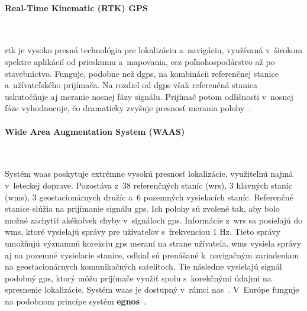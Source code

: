       \paragraph{Real-Time Kinematic (RTK) GPS} \
      
      \noindent \acrshort{rtk} je vysoko presná technológia pre lokalizáciu a~navigáciu, využívaná v~širokom spektre aplikácií od prieskumu a~mapovania, cez poľnohospodárstvo až po stavebníctvo. Funguje, podobne než \acrshort{dgps}, na kombinácii referenčnej stanice a~užívateľského prijímača. Na rozdiel od \acrshort{dgps} však referenčná stanica uskutočňuje aj meranie nosnej fázy signálu. Prijímač potom odlišnosti v~nosnej fáze vyhodnocuje, čo dramaticky zvyšuje presnosť merania polohy~\autocite{RTKGPSTechnologyPrecise}.

      \paragraph{Wide Area Augmentation System (WAAS)} \
      
      \noindent Systém \acrshort{waas} poskytuje extrémne vysokú presnosť lokalizácie, využiteľnú najmä v~leteckej doprave. Pozostáva z~38 referenčných staníc (\acrshort{wrs}), 3 hlavných staníc (\acrshort{wms}), 3 geostacionárnych družíc a~6 pozemných vysielacích staníc. Referenčné stanice slúžia na prijímanie signálu \acrshort{gps}\@. Ich polohy sú zvolené tak, aby bolo možné zachytiť akékoľvek chyby v~signáloch \acrshort{gps}\@. Informácie z~\acrshort{wrs} sa posielajú do \acrshort{wms}, ktoré vysielajú správy pre užívateľov s~frekvenciou 1 Hz. Tieto správy umožňujú významnú korekciu \acrshort{gps} meraní na strane užívateľa\@. \acrshort{wms} vysiela správy aj na pozemné vysielacie stanice, odkiaľ sú prenášané k~navigačným zariadeniam na geostacionárnych komunikačných satelitoch. Tie následne vysielajú signál podobný \acrshort{gps}, ktorý môžu prijímače využiť spolu s~korekčnými údajmi na spresnenie lokalizácie. Systém \acrshort{waas} je dostupný v~rámci \acrshort{nas}~\cite{SatelliteNavigationWAAS}. V~Európe funguje na podobnom princípe systém \textbf{\acrshort{egnos}}~\cite{EGNOS}.


